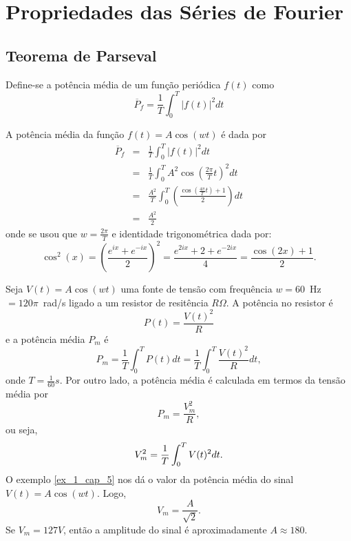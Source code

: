 \chapter{Propriedades das Séries de Fourier}
\section{Teorema de Parseval}
\begin{defn} 
Define-se a potência média de um função periódica $f(t)$ como
\begin{equation}\overline{P}_f=\frac{1}{T}\int_0^T |f(t)|^2dt\end{equation}
\end{defn}
\begin{ex}{\label{ex_1_cap_5}} A potência média da função $f(t)=A\cos(wt)$ é dada por
\begin{eqnarray*}
\overline{P}_f&=&\frac{1}{T}\int_0^T |f(t)|^2dt\\
&=&\frac{1}{T}\int_0^{T} A^2\cos\left(\frac{2\pi}{T} t\right)^2dt\\
&=&\frac{A^2}{T}\int_0^{T} \left(\frac{\cos\left(\frac{4\pi}{T} t\right)+1}{2}  \right)dt\\
&=&\frac{A^2}{2}
\end{eqnarray*}
 onde se usou que $w=\frac{2\pi}{T}$ e identidade trigonométrica dada por:
\begin{equation}\cos^2(x)=\left(\frac{e^{ix}+e^{-ix}}{2}\right)^2=\frac{e^{2ix}+2+e^{-2ix}}{4}=\frac{\cos(2x)+1}{2}.\end{equation}
 \end{ex}
\begin{ex} Seja $V(t)=A\cos(wt)$ uma fonte de tensão com frequência $w=60$\ \!\!Hz $=120\pi$\ \!\!rad/s ligado a um resistor de resitência $R\Omega$. A potência no resistor é
\begin{equation}
P(t)=\frac{V(t)^2}{R}
\end{equation}
e a potência média $P_m$ é
\begin{equation}
P_m=\frac{1}{T}\int_0^TP(t)dt=\frac{1}{T}\int_0^T\frac{V(t)^2}{R}dt,
\end{equation}
onde $T=\frac{1}{60}s$. Por outro lado, a potência média é calculada em termos da tensão média por
\begin{equation}
P_m=\frac{V_m^2}{R},
\end{equation}
ou seja,
\begin{equation}{\label{valor_RMS}}
V_m^2=\frac{1}{T}\int_0^T V(t)^2 dt.
\end{equation}
O exemplo \ref{ex_1_cap_5} nos dá o valor da potência média do sinal $V(t)=A\cos(wt)$. Logo,
\begin{equation}
V_m=\frac{A}{\sqrt{2}}.
\end{equation}
Se $V_m=127V$, então a amplitude do sinal é aproximadamente $A\approx 180$.
\end{ex}
